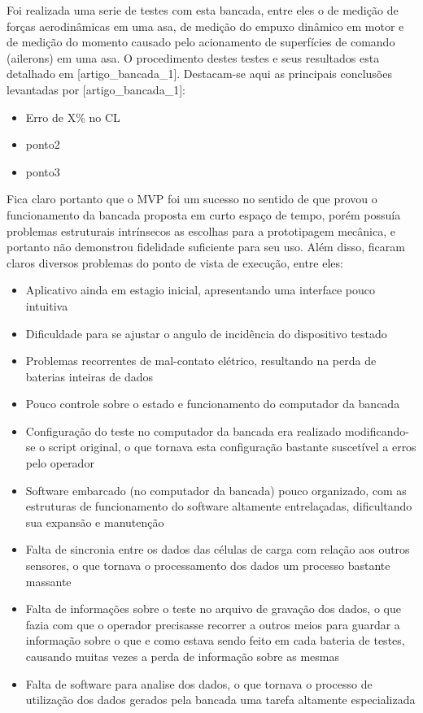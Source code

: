 Foi realizada uma serie de testes com esta bancada, entre eles o de medição de forças aerodinâmicas em uma asa, de medição do empuxo dinâmico em motor e de medição do momento causado pelo acionamento de superfícies de comando (ailerons) em uma asa. O procedimento destes testes e seus resultados esta detalhado em [artigo_bancada_1]. Destacam-se aqui as principais conclusões levantadas por [artigo_bancada_1]:

\begin{itemize}
    \item Erro de X\% no CL
    \item ponto2
    \item ponto3
\end{itemize}

Fica claro portanto que o MVP foi um sucesso no sentido de que provou o funcionamento da bancada proposta em curto espaço de tempo, porém possuía problemas estruturais intrínsecos as escolhas para a prototipagem mecânica, e portanto não demonstrou fidelidade suficiente para seu uso. Além disso, ficaram claros diversos problemas do ponto de vista de execução, entre eles:

\begin{itemize}
    \item Aplicativo ainda em estagio inicial, apresentando uma interface pouco intuitiva
    \item Dificuldade para se ajustar o angulo de incidência do dispositivo testado
    \item Problemas recorrentes de mal-contato elétrico, resultando na perda de baterias inteiras de dados
    \item Pouco controle sobre o estado e funcionamento do computador da bancada
    \item Configuração do teste no computador da bancada era realizado modificando-se o script original, o que tornava esta configuração bastante suscetível a erros pelo operador 
    \item Software embarcado (no computador da bancada) pouco organizado, com as estruturas de funcionamento do software altamente entrelaçadas, dificultando sua expansão e manutenção
    \item Falta de sincronia entre os dados das células de carga com relação aos outros sensores, o que tornava o processamento dos dados um processo bastante massante
    \item Falta de informações sobre o teste no arquivo de gravação dos dados, o que fazia com que o operador precisasse recorrer a outros meios para guardar a informação sobre o que e como estava sendo feito em cada bateria de testes, causando muitas vezes a perda de informação sobre as mesmas
    \item Falta de software para analise dos dados, o que tornava o processo de utilização dos dados gerados pela bancada uma tarefa altamente especializada
\end{itemize}


